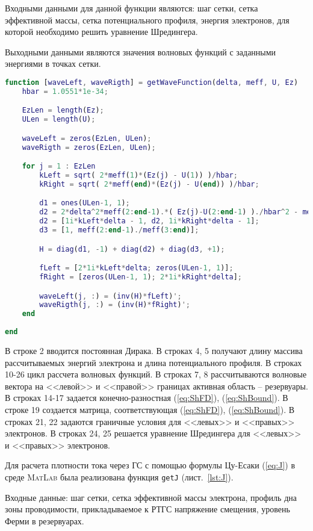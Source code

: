 Входными данными для данной функции являются: шаг сетки, сетка эффективной массы, сетка потенциального профиля, энергия электронов, для которой необходимо решить уравнение Шредингера. 

Выходными данными являются значения волновых функций с заданными энергиями в точках сетки.
\begin{lstlisting}[style=realcode,language=Matlab,caption={Решение уравнения Шредингера},label={lst:waveF}]
function [waveLeft, waveRigth] = getWaveFunction(delta, meff, U, Ez)
	hbar = 1.0551*1e-34;

	EzLen = length(Ez);
	ULen = length(U);

	waveLeft = zeros(EzLen, ULen);
	waveRigth = zeros(EzLen, ULen);

	for j = 1 : EzLen
		kLeft = sqrt( 2*meff(1)*(Ez(j) - U(1)) )/hbar;
		kRight = sqrt( 2*meff(end)*(Ez(j) - U(end)) )/hbar;

		d1 = ones(ULen-1, 1);
		d2 = 2*delta^2*meff(2:end-1).*( Ez(j)-U(2:end-1) )./hbar^2 - meff(2:end-1)./meff(3:end) - 1;
		d2 = [1i*kLeft*delta - 1, d2, 1i*kRight*delta - 1];
		d3 = [1, meff(2:end-1)./meff(3:end)];

		H = diag(d1, -1) + diag(d2) + diag(d3, +1);

		fLeft = [2*1i*kLeft*delta; zeros(ULen-1, 1)];
		fRight = [zeros(ULen-1, 1); 2*1i*kRight*delta];

		waveLeft(j, :) = (inv(H)*fLeft)';
		waveRigth(j, :) = (inv(H)*fRight)';
	end
	
end
\end{lstlisting}
В строке 2 вводится постоянная Дирака. В строках 4, 5 получают длину массива рассчитываемых энергий электрона и длина потенциального профиля. В строках 10-26 цикл рассчета волновых функций. В строках 7, 8 рассчитываются волновые вектора на <<левой>> и <<правой>> границах активная область -- резервуары. В строках 14-17 задается конечно-разностная (\ref{eq:ShFD}), (\ref{eq:ShBound}). В строке 19 создается матрица, соответствующая (\ref{eq:ShFD}), (\ref{eq:ShBound}). В строках 21, 22 задаются граничные условия для <<левых>> и <<правых>> электронов. В строках 24, 25 решается уравнение Шредингера для <<левых>> и <<правых>> электронов.

Для расчета плотности тока через ГС с помощью формулы Цу-Есаки (\ref{eq:J}) в среде \textsc{MatLab} была реализована функция \texttt{getJ} (лист.~\ref{lst:J}).

Входные данные: шаг сетки, сетка эффективной массы электрона, профиль дна зоны проводимости, прикладываемое к РТГС напряжение смещения, уровень Ферми в резервуарах.

